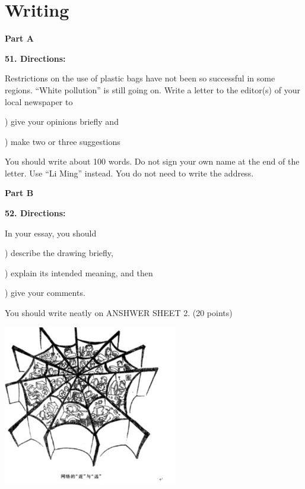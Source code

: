 
\section{Writing}
\textbf{Part A}

\textbf{51. Directions:}

\qquad Restrictions on the use of plastic bags have not been so successful in some regions. ``White pollution'' is still going on. Write a letter to the editor(s) of your local newspaper to

)      give your opinions briefly and

)      make two or three suggestions

\qquad You should write about 100 words. Do not sign your own name at the end of the letter. Use ``Li Ming'' instead. You do not need to write the address.

\vspace{10pt}

\textbf{Part B}

\textbf{52. Directions:}

\qquad In your essay, you should

) describe the drawing briefly,

) explain its intended meaning, and then

) give your comments.

\qquad You should write neatly on ANSHWER SHEET 2. (20 points)

\begin{center}\includegraphics[height=7cm]{8.jpg}\end{center}
